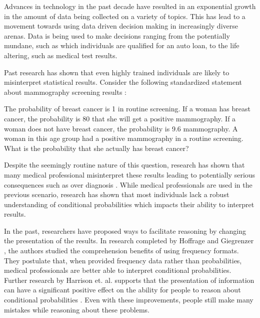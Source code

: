 
Advances in technology in the past decade have resulted in an exponential
growth in the amount of data being collected on a variety of topics. This has
lead to a movement towards using data driven decision making in increasingly
diverse arenas. Data is being used to make decisions ranging from the
potentially mundane, such as which individuals are qualified for an auto
loan, to the life altering, such as medical test results.

Past research has shown that even highly trained individuals are likely to
misinterpret statistical results. Consider the following standardized
statement about mammography screening results \cite{Ottley2016}:

\begin{displayquote}
    The probability of breast cancer is 1%
    in routine screening. If a woman has breast cancer, the probability is 80%
    that she will get a positive mammography. If a woman does not have breast
    cancer, the probability is 9.6%
    mammography. A woman in this age group had a positive mammography in a
    routine screening. What is the probability that she actually has breast
    cancer? 
\end{displayquote}

Despite the seemingly routine nature of this question, research has shown
that many medical professional misinterpret these results leading to
potentially serious consequences such as over diagnosis \cite{Friederichs2014, Welch2010}. While
medical professionals are used in the previous scenario, research has shown
that most individuals lack a robust understanding of conditional
probabilities which impacts their ability to interpret results.

In the past, researchers have proposed ways to facilitate reasoning by
changing the presentation of the results. In research completed by Hoffrage
and Giegrenzer \cite{Gigerenzer1995}, the authors studied the comprehension benefits of
using frequency formats. They postulate that, when provided frequency data
rather than probabilities, medical professionals are better able to interpret
conditional probabilities. Further research by Harrison et. al. supports that
the presentation of information can have a significant positive effect on the
ability for people to reason about conditional probabilities \cite{Ottley2016}. Even with
these improvements, people still make many mistakes while reasoning about
these problems.

